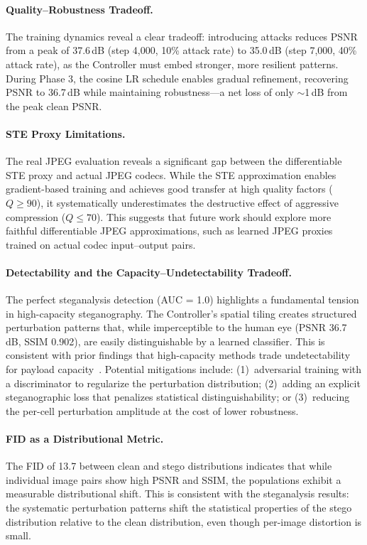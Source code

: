 \documentclass[10pt, twocolumn]{article}
\begin{document}
\paragraph{Quality--Robustness Tradeoff.}
The training dynamics reveal a clear tradeoff: introducing attacks reduces PSNR from a peak of 37.6\,dB (step 4{,}000, 10\% attack rate) to 35.0\,dB (step 7{,}000, 40\% attack rate), as the Controller must embed stronger, more resilient patterns.
During Phase 3, the cosine LR schedule enables gradual refinement, recovering PSNR to 36.7\,dB while maintaining robustness---a net loss of only $\sim$1\,dB from the peak clean PSNR.

\paragraph{STE Proxy Limitations.}
The real JPEG evaluation reveals a significant gap between the differentiable STE proxy and actual JPEG codecs.
While the STE approximation enables gradient-based training and achieves good transfer at high quality factors ($Q \geq 90$), it systematically underestimates the destructive effect of aggressive compression ($Q \leq 70$).
This suggests that future work should explore more faithful differentiable JPEG approximations, such as learned JPEG proxies trained on actual codec input--output pairs.

\paragraph{Detectability and the Capacity--Undetectability Tradeoff.}
The perfect steganalysis detection (AUC = 1.0) highlights a fundamental tension in high-capacity steganography.
The Controller's spatial tiling creates structured perturbation patterns that, while imperceptible to the human eye (PSNR 36.7\,dB, SSIM 0.902), are easily distinguishable by a learned classifier.
This is consistent with prior findings that high-capacity methods trade undetectability for payload capacity~\cite{boroumand2019deep}.
Potential mitigations include: (1)~adversarial training with a discriminator to regularize the perturbation distribution; (2)~adding an explicit steganographic loss that penalizes statistical distinguishability; or (3)~reducing the per-cell perturbation amplitude at the cost of lower robustness.

\paragraph{FID as a Distributional Metric.}
The FID of 13.7 between clean and stego distributions indicates that while individual image pairs show high PSNR and SSIM, the populations exhibit a measurable distributional shift.
This is consistent with the steganalysis results: the systematic perturbation patterns shift the statistical properties of the stego distribution relative to the clean distribution, even though per-image distortion is small.
\end{document}
